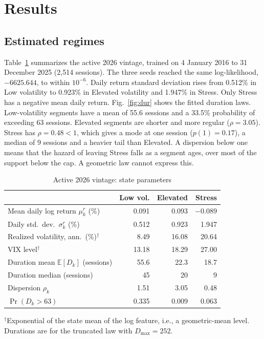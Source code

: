 \documentclass[conference]{IEEEtran}
\newcommand{\Dmax}{D_{\max}}
\begin{document}
\section{Results}
\label{sec:results}
\subsection{Estimated regimes}
Table~\ref{tab:states} summarizes the active 2026 vintage, trained on 4 January 2016 to 31 December 2025 (2,514 sessions). The three seeds reached the same log-likelihood, $-6625.644$, to within $10^{-6}$. Daily return standard deviation rises from 0.512\% in Low volatility to 0.923\% in Elevated volatility and 1.947\% in Stress. Only Stress has a negative mean daily return. Fig.~\ref{fig:dur} shows the fitted duration laws. Low-volatility segments have a mean of 55.6 sessions and a 33.5\% probability of exceeding 63 sessions. Elevated segments are shorter and more regular ($\rho=3.05$). Stress has $\rho=0.48<1$, which gives a mode at one session ($p(1)=0.17$), a median of 9 sessions and a heavier tail than Elevated. A dispersion below one means that the hazard of leaving Stress falls as a segment ages, over most of the support below the cap. A geometric law cannot express this.

\begin{table}[t]
\centering
\caption{Active 2026 vintage: state parameters}
\label{tab:states}
\footnotesize
\setlength{\tabcolsep}{4pt}
\begin{tabular}{@{}lrrr@{}}
\toprule
 & Low vol. & Elevated & Stress \\
\midrule
Mean daily log return $\mu^r_k$ (\%) & 0.091 & 0.093 & $-0.089$ \\
Daily std.\ dev.\ $\sigma^r_k$ (\%) & 0.512 & 0.923 & 1.947 \\
Realized volatility, ann.\ (\%)$^\dagger$ & 8.49 & 16.08 & 20.64 \\
VIX level$^\dagger$ & 13.18 & 18.29 & 27.00 \\
Duration mean $\mathbb{E}[D_k]$ (sessions) & 55.6 & 22.3 & 18.7 \\
Duration median (sessions) & 45 & 20 & 9 \\
Dispersion $\rho_k$ & 1.51 & 3.05 & 0.48 \\
$\Pr(D_k>63)$ & 0.335 & 0.009 & 0.063 \\
\bottomrule
\end{tabular}

\vspace{2pt}
\parbox{\columnwidth}{\scriptsize $^\dagger$Exponential of the state mean of the log feature, i.e., a geometric-mean level. Durations are for the truncated law with $\Dmax=252$.}
\end{table}
\end{document}

